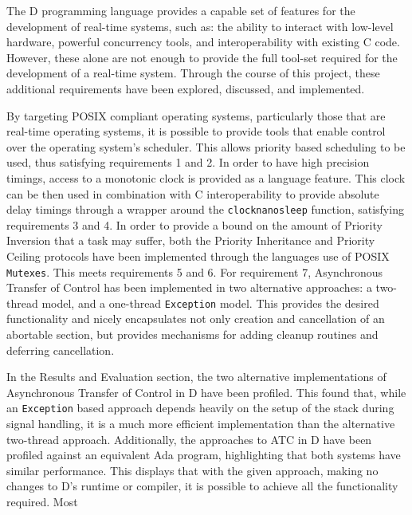 

The D programming language provides a capable set of features for the 
development of real-time systems, such as: the ability to interact with low-level 
hardware, powerful concurrency tools, and interoperability with existing C code. 
However, these alone are not enough to provide the full tool-set required for
the development of a real-time system. 
Through the course of this project, these additional requirements have been 
explored, discussed, and implemented.
\par\bigskip\noindent
By targeting POSIX compliant operating systems, particularly those that are
real-time operating systems, it is possible to provide tools that enable control 
over the operating system's scheduler. 
This allows priority based scheduling to be used, thus satisfying requirements
1 and 2.
In order to have high precision timings, access to a monotonic clock is provided 
as a language feature. 
This clock can be then used in combination with C
interoperability to provide absolute delay timings through a wrapper around the
\texttt{clock\textunderscore{}nanosleep} function, satisfying requirements 3 and
4. 
In order to provide a bound on the amount of Priority Inversion that a task
may suffer, both the Priority Inheritance and Priority Ceiling protocols have
been implemented through the languages use of POSIX \texttt{Mutexes}. This meets
requirements 5 and 6. 
For requirement 7, Asynchronous Transfer of Control has been implemented in two 
alternative approaches: a two-thread model, and a one-thread \texttt{Exception} model. 
This provides the desired functionality and 
nicely encapsulates not only creation and cancellation of an
abortable section, but provides mechanisms for adding cleanup routines and deferring 
cancellation. 
\par\bigskip\noindent
In the Results and Evaluation section, the two alternative implementations of
Asynchronous Transfer of Control in D have been profiled. 
This found that, while an \texttt{Exception} based approach depends 
heavily on the setup of the stack during signal handling, it is a much more efficient
implementation than the alternative two-thread approach. 
Additionally, the approaches to ATC in D have been profiled against an
equivalent Ada program, highlighting that both systems have similar performance.
This displays that with the given approach, making no changes to D's runtime or
compiler, it is possible to achieve all the functionality required. Most
